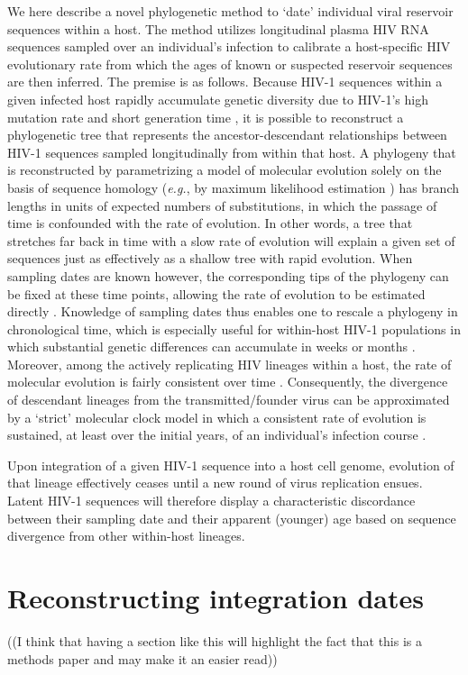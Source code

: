 \documentclass[12pt,onecolumn,twoside]{pnas-new}
\begin{document}
We here describe a novel phylogenetic method to `date' individual viral reservoir sequences within a host.
The method utilizes longitudinal plasma HIV RNA sequences sampled over an individual's infection to calibrate a host-specific HIV evolutionary rate from which the ages of known or suspected reservoir sequences are then inferred. The premise is as follows.
Because HIV-1 sequences within a given infected host rapidly accumulate genetic diversity due to HIV-1's high mutation rate and short generation time \cite{Alizon13,Rambaut04,Shankarappa99}, it is possible to reconstruct a phylogenetic tree that represents the ancestor-descendant relationships between HIV-1 sequences sampled longitudinally from within that host.
A phylogeny that is reconstructed by parametrizing a model of molecular evolution solely on the basis of sequence homology (\emph{e.g.}, by maximum likelihood estimation \cite{Felsenstein81}) has branch lengths in units of expected numbers of substitutions, in which the passage of time is confounded with the rate of evolution.
In other words, a tree that stretches far back in time with a slow rate of evolution will explain a given set of sequences just as effectively as a shallow tree with rapid evolution.
When sampling dates are known however, the corresponding tips of the phylogeny can be fixed at these time points, allowing the rate of evolution to be estimated directly \cite{Rodrigo99}.
Knowledge of sampling dates thus enables one to rescale a phylogeny in chronological time, which is especially useful for within-host HIV-1 populations in which substantial genetic differences can accumulate in weeks or months \cite{Williamson03}.
Moreover, among the actively replicating HIV lineages within a host, the rate of molecular evolution is fairly consistent over time \cite{Korber00,Kuhner95,Leitner99,Park16}.
Consequently, the divergence of descendant lineages from the transmitted/founder virus can be approximated by a `strict' molecular clock model in which a consistent rate of evolution is sustained, at least over the initial years, of an individual's infection course \cite{Keele08}. 

Upon integration of a given HIV-1 sequence into a host cell genome, evolution of that lineage effectively ceases until a new round of virus replication ensues.
Latent HIV-1 sequences will therefore display a characteristic discordance between their sampling date and their apparent (younger) age based on sequence divergence from other within-host lineages.

\section*{Reconstructing integration dates}
((I think that having a section like this will highlight the fact that this is a methods paper and may make it an easier read))
\end{document}

